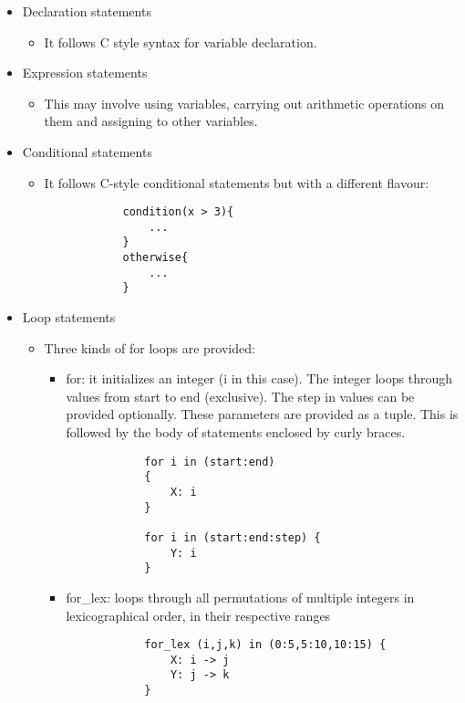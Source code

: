 \begin{itemize}
    \item Declaration statements
    \begin{itemize}
        \item It follows C style syntax for variable declaration.
    \end{itemize}
        
    \item Expression statements
    \begin{itemize}
        \item This may involve using variables, carrying out arithmetic operations on them and assigning to other variables. 
    \end{itemize}
    \item Conditional statements
    \begin{itemize}
        \item It follows C-style conditional statements but with a different flavour:
        \begin{lstlisting}
            condition(x > 3){
                ...    
            }
            otherwise{
                ...
            }
        \end{lstlisting}
    \end{itemize}
    \item Loop statements
    \begin{itemize}
        \item Three kinds of for loops are provided:
        \begin{itemize}
            \item for: it initializes an integer (i in this case). The integer loops through values from start to end (exclusive). The step in values can be provided optionally. These parameters are provided as a tuple. This is followed by the body of statements enclosed by curly braces.
            \begin{lstlisting}
            for i in (start:end) 
            {
                X: i 
            }
            
            for i in (start:end:step) {
                Y: i 
            }
            \end{lstlisting}
                
            \item for\_lex: loops through all permutations of multiple integers in lexicographical order, in their respective ranges
            \begin{lstlisting}
            for_lex (i,j,k) in (0:5,5:10,10:15) {
                X: i -> j
                Y: j -> k
            }
            \end{lstlisting}
            

\end{itemize}
\end{itemize}
\end{itemize}
